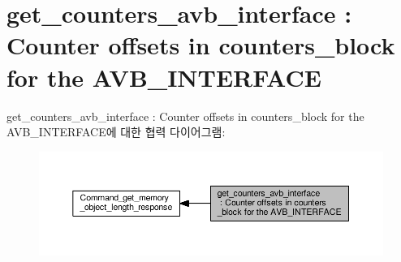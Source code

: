 \hypertarget{group__get__counters__avb__interface}{}\section{get\+\_\+counters\+\_\+avb\+\_\+interface \+: Counter offsets in counters\+\_\+block for the A\+V\+B\+\_\+\+I\+N\+T\+E\+R\+F\+A\+CE}
\label{group__get__counters__avb__interface}
get\+\_\+counters\+\_\+avb\+\_\+interface \+: Counter offsets in counters\+\_\+block for the A\+V\+B\+\_\+\+I\+N\+T\+E\+R\+F\+A\+C\+E에 대한 협력 다이어그램\+:
\nopagebreak
\begin{figure}[H]
\begin{center}
\leavevmode
\includegraphics[width=350pt]{group__get__counters__avb__interface}
\end{center}
\end{figure}
